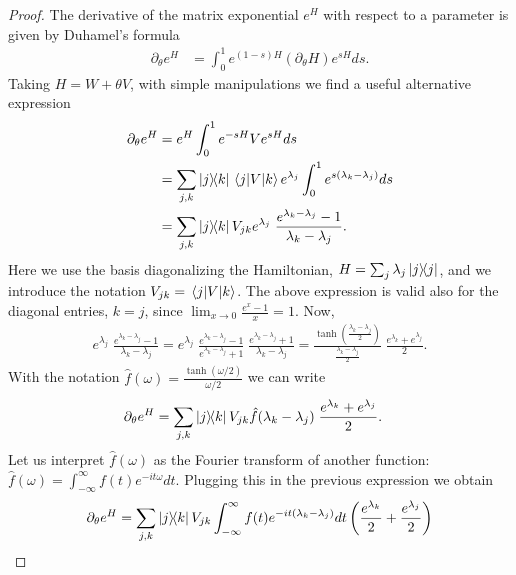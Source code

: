\documentclass[
    reprint,
    aps,
    prx,
    longbibliography
]{revtex4-2}
\begin{document}
\begin{proof}
The derivative of the matrix exponential $e^H$ with respect to a parameter is given by Duhamel's formula~\cite{Haber_2018}
\begin{align}
\label{eq:duhamel}
    \partial_\theta e^H &= \int_0^1 e^{(1-s)H} (\partial_\theta H) e^{s H} ds .
\end{align}
Taking $H=W+\theta V$, with simple manipulations we find a useful alternative expression
\begin{align}
\label{eq:manip1}
\begin{split}
    \partial_\theta e^H &= e^H \int_0^1 e^{-sH} V e^{s H} ds \\
    &= \sum_{j,k} \ketbra{j}{k} \matrixel{j}{V}{k} e^{\lambda_j} \int_0^1 e^{s(\lambda_k - \lambda_j)} ds \\
    &= \sum_{j,k} \ketbra{j}{k} V_{jk} e^{\lambda_j} \; \frac{e^{\lambda_k - \lambda_j} - 1}{\lambda_k - \lambda_j} .
\end{split}
\end{align}
Here we use the basis diagonalizing the Hamiltonian, $H = \sum_{j} \lambda_j \dyad{j}$, and we introduce the notation $V_{jk} = \matrixel{j}{V}{k}$. The above expression is valid also for the diagonal entries, $k=j$, since $\lim_{x \rightarrow 0} \frac{e^x - 1}{x} = 1$.  Now,
\begin{align}
    e^{\lambda_j} \; \frac{e^{\lambda_k - \lambda_j} - 1}{\lambda_k - \lambda_j}  =  e^{\lambda_j} \; \frac{e^{\lambda_k - \lambda_j} - 1}{e^{\lambda_k - \lambda_j} +1 } \; \frac{e^{\lambda_k - \lambda_j} +1 }{\lambda_k - \lambda_j}  =  \frac{\tanh( \tfrac{\lambda_k - \lambda_j}{2})}{ \tfrac{\lambda_k - \lambda_j}{2} } \; \frac{e^{\lambda_k} + e^{\lambda_j} }{2} .
\end{align}
With the notation $\hat{f}(\omega) = \frac{\tanh(\omega/2)}{\omega/2}$ we can write
\begin{align}
    \partial_\theta e^H &= \sum_{j,k} \ketbra{j}{k} V_{jk} \hat{f}(\lambda_k - \lambda_j) \; \frac{e^{\lambda_k} + e^{\lambda_j} }{2} .
\end{align}
Let us interpret $\hat{f}(\omega)$ as the Fourier transform of another function: $\hat{f}(\omega) = \int_{-\infty}^\infty f(t) e^{-i t \omega} dt$. Plugging this in the previous expression we obtain
\begin{align}
\begin{split}
\label{eq:ExpDerCommutator} 
    \partial_\theta e^H &= \sum_{j,k} \ketbra{j}{k} V_{jk} \int_{-\infty}^{\infty} f(t) e^{-it(\lambda_k - \lambda_j)} dt \left( \frac{e^{\lambda_k}}{2} + \frac{e^{\lambda_j}}{2} \right) \\

\end{split}
\end{align}
\end{proof}
\end{document}
